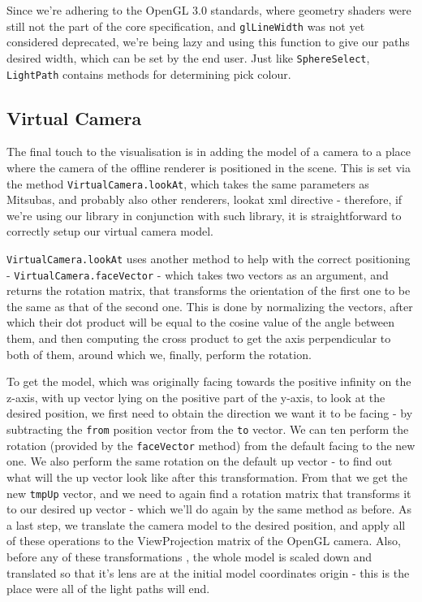 Since we're adhering to the OpenGL 3.0 standards, where geometry shaders were still not the part of the core specification, and \texttt{glLineWidth} was not yet considered deprecated, we're being lazy and using this function to give our paths desired width, which can be set by the end user. Just like \texttt{SphereSelect}, \texttt{LightPath} contains methods for determining pick colour.

\subsection{Virtual Camera}

The final touch to the visualisation is in adding the model of a camera to a place where the camera of the offline renderer is positioned in the scene. This is set via the method \texttt{VirtualCamera.lookAt}, which takes the same parameters as Mitsubas, and probably also other renderers, lookat xml directive - therefore, if we're using our library in conjunction with such library, it is straightforward to correctly setup our virtual camera model.

\texttt{VirtualCamera.lookAt} uses another method to help with the correct positioning - \texttt{VirtualCamera.faceVector} - which takes two vectors as an argument, and returns the rotation matrix, that transforms the orientation of the first one to be the same as that of the second one. This is done by normalizing the vectors, after which their dot product will be equal to the cosine value of the angle between them, and then computing the cross product to get the axis perpendicular to both of them, around which we, finally, perform the rotation. 

To get the model, which was originally facing towards the positive infinity on the z-axis, with up vector lying on the positive part of the y-axis, to look at the desired position, we first need to obtain the direction we want it to be facing - by subtracting the \texttt{from} position vector from the \texttt{to} vector. We can ten perform the rotation (provided by the \texttt{faceVector} method) from the default facing to the new one. We also perform the same rotation on the default up vector - to find out what will the up vector look like after this transformation. From that we get the new \texttt{tmpUp} vector, and we need to again find a rotation matrix that transforms it to our desired up vector - which we'll do again by the same method as before. As a last step, we translate the camera model to the desired position, and apply all of these operations to the ViewProjection matrix of the OpenGL camera. Also, before any of these transformations , the whole model is scaled down and translated so that it's lens are at the initial model coordinates origin - this is the place were all of the light paths will end.